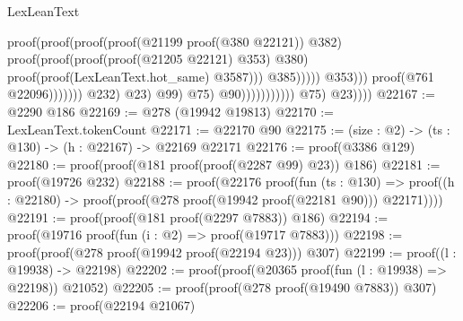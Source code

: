 \begin{lexlean}{LexLeanText}
\begin{coremodule}
                                                                                            proof(proof(proof(proof(@21199
                                                                                                      proof(@380
                                                                                                          @22121))
                                                                                                    @382)
                                                                                                  proof(proof(proof(proof(@21205
                                                                                                            @22121)
                                                                                                          @353)
                                                                                                        @380)
                                                                                                      proof(proof(LexLeanText.hot_same)
                                                                                                          @3587)))
                                                                                                @385)))))
                                                                              @353)))
                                                                    proof(@761 @22096)))))))
                                                      @232)
                                                    @23)
                                                  @99)
                                                @75)
                                              @90)))))))))))
              @75)
            @23))))
@22167 := @2290 @186
@22169 := @278 (@19942 @19813)
@22170 := LexLeanText.tokenCount
@22171 := @22170 @90
@22175 := (size : @2) -> (ts : @130) -> (h : @22167) -> @22169 @22171
@22176 := proof(@3386 @129)
@22180 := proof(proof(@181 proof(proof(@2287 @99) @23)) @186)
@22181 := proof(@19726 @232)
@22188 := proof(@22176
      proof(fun (ts : @130) =>
        proof((h : @22180) -> proof(proof(@278 proof(@19942 proof(@22181 @90))) @22171))))
@22191 := proof(proof(@181 proof(@2297 @7883)) @186)
@22194 := proof(@19716 proof(fun (i : @2) => proof(@19717 @7883)))
@22198 := proof(proof(@278 proof(@19942 proof(@22194 @23))) @307)
@22199 := proof((l : @19938) -> @22198)
@22202 := proof(proof(@20365 proof(fun (l : @19938) => @22198)) @21052)
@22205 := proof(proof(@278 proof(@19490 @7883)) @307)
@22206 := proof(@22194 @21067)

\end{coremodule}
\end{lexlean}
